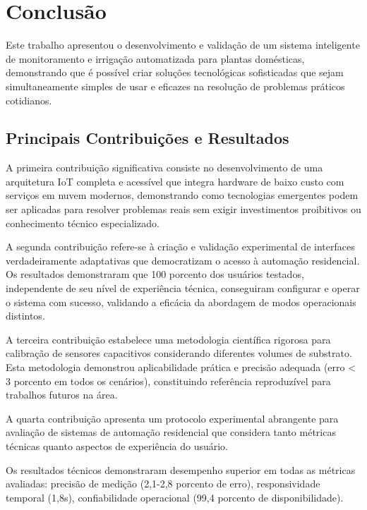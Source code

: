 \documentclass[twoside,english,brazilian]{UNISINOSmonografia}
\begin{document}
\chapter{Conclusão}

Este trabalho apresentou o desenvolvimento e validação de um sistema inteligente de monitoramento e irrigação automatizada para plantas domésticas, demonstrando que é possível criar soluções tecnológicas sofisticadas que sejam simultaneamente simples de usar e eficazes na resolução de problemas práticos cotidianos.

\section{Principais Contribuições e Resultados}

A primeira contribuição significativa consiste no desenvolvimento de uma arquitetura IoT completa e acessível que integra hardware de baixo custo com serviços em nuvem modernos, demonstrando como tecnologias emergentes podem ser aplicadas para resolver problemas reais sem exigir investimentos proibitivos ou conhecimento técnico especializado.

A segunda contribuição refere-se à criação e validação experimental de interfaces verdadeiramente adaptativas que democratizam o acesso à automação residencial. Os resultados demonstraram que 100 porcento dos usuários testados, independente de seu nível de experiência técnica, conseguiram configurar e operar o sistema com sucesso, validando a eficácia da abordagem de modos operacionais distintos.

A terceira contribuição estabelece uma metodologia científica rigorosa para calibração de sensores capacitivos considerando diferentes volumes de substrato. Esta metodologia demonstrou aplicabilidade prática e precisão adequada (erro < 3 porcento em todos os cenários), constituindo referência reproduzível para trabalhos futuros na área.

A quarta contribuição apresenta um protocolo experimental abrangente para avaliação de sistemas de automação residencial que considera tanto métricas técnicas quanto aspectos de experiência do usuário.

Os resultados técnicos demonstraram desempenho superior em todas as métricas avaliadas: precisão de medição (2,1-2,8 porcento de erro), responsividade temporal (1,8s), confiabilidade operacional (99,4 porcento de disponibilidade).
\end{document}
